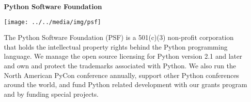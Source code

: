 \textbf{Python Software Foundation}

\texttt{[image: ../../media/img/psf]}

The Python Software Foundation (PSF) is a 501(c)(3) non-profit corporation that
holds the intellectual property rights behind the Python programming language.
We manage the open source licensing for Python version 2.1 and later and own and
protect the trademarks associated with Python. We also run the North American
PyCon conference annually, support other Python conferences around the world,
and fund Python related development with our grants program and by funding
special projects.
